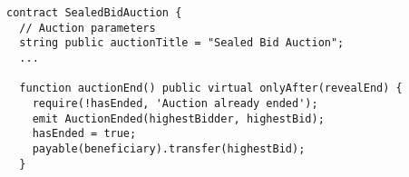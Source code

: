 \begin{lstlisting}[language=Solidity]
contract SealedBidAuction {
  // Auction parameters
  string public auctionTitle = "Sealed Bid Auction";
  ... 
  
  function auctionEnd() public virtual onlyAfter(revealEnd) {
    require(!hasEnded, 'Auction already ended');
    emit AuctionEnded(highestBidder, highestBid);
    hasEnded = true;
    payable(beneficiary).transfer(highestBid);
  }
\end{lstlisting}